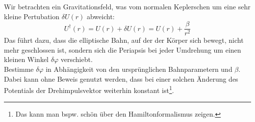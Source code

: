 \begin{Exercise}[label = phshift, title = Periheldrehung, difficulty = 5, origin = Aaron Wild]
	Wir betrachten ein Gravitationsfeld, was vom normalen Keplerschen um eine sehr kleine Pertubation $\delta U\left(r\right)$ abweicht:
	\begin{equation}\label{phshift:pot}
		U^\dagger\left(r\right) = U\left(r\right) + \delta U\left(r\right) = U\left(r\right)+\frac{\beta}{r^2}
	\end{equation}
	Das führt dazu, dass die elliptische Bahn, auf der der Körper sich bewegt, nicht mehr geschlossen ist, sondern sich die Periapsis bei jeder Umdrehung um einen kleinen Winkel $\delta \varphi$ verschiebt. \\
	Bestimme $\delta \varphi$ in Abhängigkeit von den ursprünglichen Bahnparametern und $\beta$. \\
	Dabei kann ohne Beweis genutzt werden, dass bei einer solchen Änderung des Potentials der Drehimpulsvektor weiterhin konstant ist\footnote[2]{Das kann man bspw. schön über den Hamiltonformalismus zeigen.}.
	
\end{Exercise}
